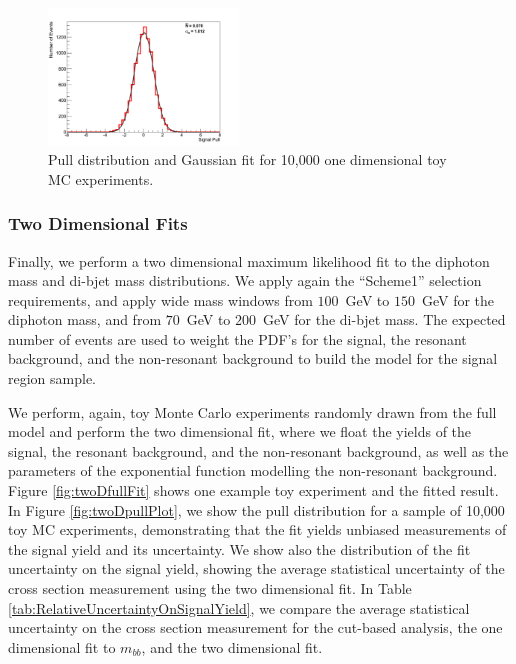 \documentclass{cmspaper}
\begin{document}
\begin{figure}[h]
  \centering
  \includegraphics[width=0.45\textwidth]{figures/sigPullFitOneD.pdf}
  \caption{Pull distribution and Gaussian fit for 10,000 one dimensional toy MC experiments.}
  \label{fig:oneDfullFit}
\end{figure}

\subsubsection{Two Dimensional Fits}
Finally, we perform a two dimensional maximum likelihood fit to the diphoton mass and di-bjet mass distributions. 
We apply again the ``Scheme1'' selection requirements, and apply wide mass windows from $100$~GeV to $150$~GeV
for the diphoton mass, and from $70$~GeV to $200$~GeV for the di-bjet mass. The expected number of events
are used to weight the PDF's for the signal, the resonant background, and the non-resonant background to build
the model for the signal region sample. 

We perform, again, toy Monte Carlo experiments randomly drawn from the full model and perform the two dimensional
fit, where we float the yields of the signal, the resonant background, and the non-resonant background, as well as
the parameters of the exponential function modelling the non-resonant background. Figure \ref{fig:twoDfullFit}
shows one example toy experiment and the fitted result. In Figure \ref{fig:twoDpullPlot},
we show the pull distribution for a sample of 10,000 toy MC experiments, demonstrating that the fit yields unbiased
measurements of the signal yield and its uncertainty. We show also the distribution of the fit uncertainty
on the signal yield, showing the average statistical uncertainty of the cross section measurement using the two
dimensional fit. In Table \ref{tab:RelativeUncertaintyOnSignalYield},
we compare the average statistical uncertainty on the cross section measurement
for the cut-based analysis, the one dimensional fit to $m_{bb}$, and the two dimensional fit. 
\end{document}
